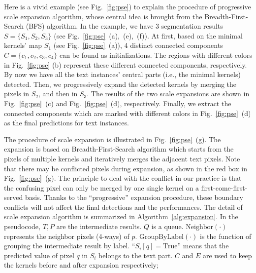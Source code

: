\documentclass[10pt,twocolumn,letterpaper]{article}
\begin{document}
	Here is a vivid example (see Fig.~\ref{fig:pse}) to explain the procedure of progressive scale expansion algorithm, whose central idea is brought from the Breadth-First-Search (BFS) algorithm. In the example, we have $3$ segmentation results $S = \{S_1, S_2, S_3\}$ (see Fig.~\ref{fig:pse}~(a),~(e),~(f)). At first, based on the minimal kernels' map $S_1$ (see Fig.~\ref{fig:pse}~(a)), 4 distinct connected components $C = \{c_1, c_2, c_3, c_4\}$ can be found as initializations. The regions with different colors in Fig.~\ref{fig:pse} (b) represent these different connected components, respectively. By now we have all the text instances' central parts (i.e., the minimal kernels) detected. 
	Then, we progressively expand the detected kernels by merging the pixels in $S_2$, and then in $S_3$. The results of the two scale expansions are shown in Fig.~\ref{fig:pse}~(c) and Fig.~\ref{fig:pse}~(d), respectively.
	Finally, we extract the connected components which are marked with different colors in Fig.~\ref{fig:pse}~(d) as the final predictions for text instances.
	
	
	The procedure of scale expansion is illustrated in Fig.~\ref{fig:pse}~(g). The expansion is based on Breadth-First-Search algorithm which starts from the pixels of multiple kernels and iteratively merges the adjacent text pixels. Note that there may be conflicted pixels during expansion, as shown in the red box in Fig.~\ref{fig:pse}~(g). The principle to deal with the conflict in our practice is that the confusing pixel can only be merged by one single kernel on a first-come-first-served basis. Thanks to the ``progressive'' expansion procedure, these boundary conflicts will not affect the final detections and the performances.
	The detail of scale expansion algorithm is summarized in Algorithm~\ref{alg:expansion}. In the pseudocode, $T, P$ are the intermediate results. $Q$ is a queue. $\mbox{Neighbor}(\cdot)$ represents the neighbor pixels (4-ways) of $p$. $\mbox{GroupByLabel}(\cdot)$ is the function of grouping the intermediate result by label. ``$S_i[q] = \mbox{True}$'' means that the predicted value of pixel $q$ in $S_i$ belongs to the text part. $C$ and $E$ are used to keep the kernels before and after expansion
	respectively;
	
\end{document}
